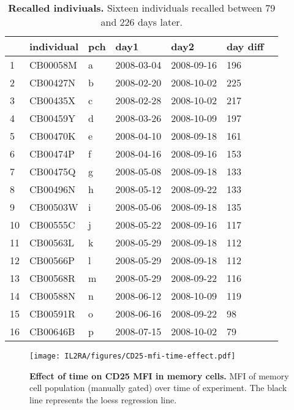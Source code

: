 \begin{table}[ht]
\centering
\begin{tabular}{lllllll}
  \hline
         & individual & pch & day1       & day2       & day diff \\
  \hline
  1      & CB00058M   & a   & 2008-03-04 & 2008-09-16 & 196 \\
  2      & CB00427N   & b   & 2008-02-20 & 2008-10-02 & 225 \\
  3      & CB00435X   & c   & 2008-02-28 & 2008-10-02 & 217 \\
  4      & CB00459Y   & d   & 2008-03-26 & 2008-10-09 & 197 \\
  5      & CB00470K   & e   & 2008-04-10 & 2008-09-18 & 161 \\
  6      & CB00474P   & f   & 2008-04-16 & 2008-09-16 & 153 \\
  7      & CB00475Q   & g   & 2008-05-08 & 2008-09-18 & 133 \\
  8      & CB00496N   & h   & 2008-05-12 & 2008-09-22 & 133 \\
  9      & CB00503W   & i   & 2008-05-06 & 2008-09-18 & 135 \\
  10     & CB00555C   & j   & 2008-05-22 & 2008-09-16 & 117 \\
  11     & CB00563L   & k   & 2008-05-29 & 2008-09-18 & 112 \\
  12     & CB00566P   & l   & 2008-05-29 & 2008-09-18 & 112 \\
  13     & CB00568R   & m   & 2008-05-29 & 2008-09-22 & 116 \\
  14     & CB00588N   & n   & 2008-06-12 & 2008-10-09 & 119 \\
  15     & CB00591R   & o   & 2008-06-16 & 2008-09-22 & 98 \\
  16     & CB00646B   & p   & 2008-07-15 & 2008-10-02 & 79  \\
  \hline
\end{tabular}
\caption{
\label{table:IL2RA-recalled-individuals}
\textbf{Recalled indiviuals.}
Sixteen individuals recalled between 79 and 226 days later.
}
\end{table}

\begin{figure}[h]
\centering
\texttt{[image: IL2RA/figures/CD25-mfi-time-effect.pdf]}
\caption{
\label{figure:memory-CD25MFI-time-effect}
\textbf{Effect of time on CD25 MFI in memory cells.}
 MFI of memory cell population (manually gated) over time of experiment.
The black line represents the loess regression line.
}
\end{figure}


